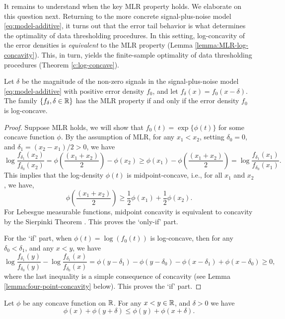 It remains to understand when the key MLR property holds.  We elaborate on this question next.
Returning to the more concrete signal-plus-noise model \eqref{eq:model-additive}, it turns out that the error tail behavior is what determines the optimality of data thresholding procedures.
In this setting, log-concavity of the error densities is \emph{equivalent} to the MLR property (Lemma \ref{lemma:MLR-log-concavity}). This, in turn, yields the finite-sample optimality of data thresholding procedures (Theorem \ref{c:log-concave}).

\begin{lemma} \label{lemma:MLR-log-concavity}
Let $\delta$ be the magnitude of the non-zero signals in the signal-plus-noise model \eqref{eq:model-additive} with positive error density $f_0$, and let $f_\delta(x) = f_0(x-\delta)$.
The family $\{f_\delta, \delta \in \mathbb R\}$ has the MLR property if and only if the error density $f_0$ is log-concave.
\end{lemma}

\begin{proof}%
Suppose MLR holds, we will show that $f_0(t) = \exp\{\phi(t)\}$ for some concave function $\phi$.
By the assumption of MLR, for any $x_1 < x_2$, setting $\delta_0 = 0$, and $\delta_1 = (x_2 - x_1)/2 > 0$, we have
\begin{equation*}
    \log{\frac{f_{\delta_1}(x_2)}{f_{\delta_0}(x_2)}}
    = \phi\left(\frac{(x_1+x_2)}{2}\right)- \phi(x_2) 
    \ge \phi(x_1)- \phi\left(\frac{(x_1+x_2)}{2}\right) 
    = \log{\frac{f_{\delta_1}(x_1)}{f_{\delta_0}(x_1)}}.
\end{equation*}
This implies that the log-density $\phi(t)$ is midpoint-concave, i.e., for all $x_1$ and $x_2$, we have,
\begin{equation}
    \phi\left(\frac{(x_1+x_2)}{2}\right) 
    \ge \frac{1}{2} \phi(x_1) + \frac{1}{2} \phi(x_2).
\end{equation}
For Lebesgue measurable functions, midpoint concavity is equivalent to concavity by the Sierpinki Theorem \citep[see, e.g., Sec I.3 of][]{donoghue2014distributions}. This proves the `only-if' part.

For the `if' part, when  $\phi(t) = \log{(f_0(t))}$ is log-concave, then for any $\delta_0 < \delta_1$, and any $x<y$, we have
\begin{equation} \label{eq:concavity-implies-MLR}
    \log{\frac{f_{\delta_1}(y)}{f_{\delta_0}(y)}} - \log{\frac{f_{\delta_1}(x)}{f_{\delta_0}(x)}}
    = \phi(y-\delta_1) - \phi(y-\delta_0) - \phi(x-\delta_1) + \phi(x-\delta_0) \ge 0,
\end{equation}
where the last inequality is a simple consequence of concavity (see Lemma \ref{lemma:four-point-concavity} below). This proves the `if' part.
\end{proof}
\begin{lemma} \label{lemma:four-point-concavity}
Let $\phi$ be any concave function on $\mathbb R$. For any $x<y\in\mathbb R$, and $\delta>0$ we have
$$
\phi(x) + \phi(y+\delta) \le \phi(y) + \phi(x+\delta).
$$
\end{lemma}

